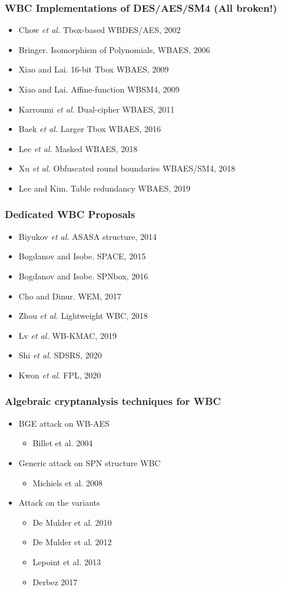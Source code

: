 \documentclass{beamer}
\begin{document}
\frame
{
\frametitle{WBC Implementations of DES/AES/SM4 (All broken!)}
\begin{itemize}
\item Chow \textit{et al.} Tbox-based WBDES/AES, 2002
\item Bringer. Isomorphism of Polynomials, WBAES, 2006
\item Xiao and Lai. 16-bit Tbox WBAES, 2009
\item Xiao and Lai. Affine-function WBSM4, 2009
\item Karroumi \textit{et al.} Dual-cipher WBAES, 2011
\item Baek \textit{et al.} Larger Tbox WBAES, 2016
\item Lee \textit{et al.} Masked WBAES, 2018
\item Xu \textit{et al.} Obfuscated round boundaries WBAES/SM4, 2018
\item Lee and Kim. Table redundancy WBAES, 2019
\end{itemize}
}

\frame
{
\frametitle{Dedicated WBC Proposals}
\begin{itemize}
\item Biyukov \textit{et al.} ASASA structure, 2014
\item Bogdanov and Isobe. SPACE, 2015
\item Bogdanov and Isobe. SPNbox, 2016
\item Cho and Dinur. WEM, 2017
\item Zhou \textit{et al.} Lightweight WBC, 2018
\item Lv \textit{et al.} WB-KMAC, 2019
\item Shi \textit{et al.} SDSRS, 2020
\item Kwon \textit{et al.} FPL, 2020
\end{itemize}
}

\frame
{
\frametitle{Algebraic cryptanalysis techniques for WBC}
\begin{itemize}
\item BGE attack on WB-AES
\begin{itemize}
\item Billet et al. 2004
\end{itemize}

\item Generic attack on SPN structure WBC
\begin{itemize}
\item Michiels et al. 2008
\end{itemize}

\item Attack on the variants
\begin{itemize}
\item De Mulder et al. 2010
\item De Mulder et al. 2012
\item Lepoint et al. 2013
\item Derbez 2017
\end{itemize}
\end{itemize}
}
\end{document}
